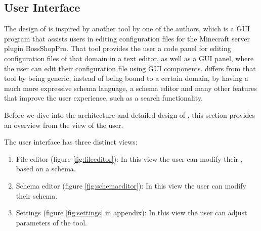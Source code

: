 
\subsection{User Interface}\label{subsec:overview}
The design of \toolname{} is inspired by another tool\cite{githubBspEditor} by one of the authors, which is a GUI program that assists users in editing configuration files for the Minecraft server plugin BossShopPro\cite{bossshoppro}.
That tool provides the user a code panel for editing configuration files of that domain in a text editor, as well as a GUI panel, where the user can edit their configuration file using GUI components.
\toolname{} differs from that tool by being generic, instead of being bound to a certain domain, by having a much more expressive schema language, a schema editor and many other features that improve the user experience, such as a search functionality.

Before we dive into the architecture and detailed design of \toolname{}, this section provides an overview from the view of the user.

The user interface has three distinct views:
\begin{enumerate}
	\item File editor (figure \ref{fig:fileeditor}): In this view the user can modify their \cfgfile{}, based on a schema.
	\item Schema editor (figure \ref{fig:schemaeditor}): In this view the user can modify their schema.
	\item Settings (figure \ref{fig:settings} in appendix): In this view the user can adjust parameters of the tool.
\end{enumerate}


